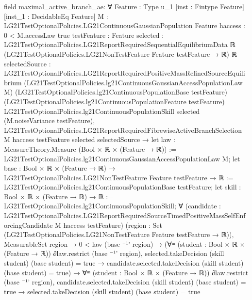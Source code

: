 \documentclass[10pt]{article}
\begin{document}
\begin{ReviewVerbatim}
field maximal_active_branch_ae:
∀ {Feature : Type u_1} [inst : Fintype Feature] [inst_1 : DecidableEq Feature]
  {M : LG21TestOptionalPolicies.LG21ContinuousGaussianPopulation Feature} {haccess : 0 < M.accessLaw {true}}
  {testFeature : Feature}
  {selected :
    LG21TestOptionalPolicies.LG21ReportRequiredSequentialEquilibriumData ℝ
      (LG21TestOptionalPolicies.LG21NonTestFeature Feature testFeature → ℝ) ℝ}
  {selectedSource :
    LG21TestOptionalPolicies.LG21ReportRequiredPositiveMassRefinedSourceEquilibrium
      (LG21TestOptionalPolicies.lg21ContinuousGaussianAccessPopulationLaw M)
      (LG21TestOptionalPolicies.lg21ContinuousPopulationBase testFeature)
      (LG21TestOptionalPolicies.lg21ContinuousPopulationFeature testFeature)
      LG21TestOptionalPolicies.lg21ContinuousPopulationSkill selected (M.noiseVariance testFeature)},
  LG21TestOptionalPolicies.LG21ReportRequiredFibrewiseActiveBranchSelection M haccess testFeature selected
      selectedSource →
    let law : MeasureTheory.Measure (Bool × ℝ × (Feature → ℝ)) :=
      LG21TestOptionalPolicies.lg21ContinuousGaussianAccessPopulationLaw M;
    let base : Bool × ℝ × (Feature → ℝ) → LG21TestOptionalPolicies.LG21NonTestFeature Feature testFeature → ℝ :=
      LG21TestOptionalPolicies.lg21ContinuousPopulationBase testFeature;
    let skill : Bool × ℝ × (Feature → ℝ) → ℝ := LG21TestOptionalPolicies.lg21ContinuousPopulationSkill;
    ∀
      (candidate :
        LG21TestOptionalPolicies.LG21ReportRequiredSourceTimedPositiveMassSelfEnforcingCandidate M haccess testFeature)
      (region : Set (LG21TestOptionalPolicies.LG21NonTestFeature Feature testFeature → ℝ)),
      MeasurableSet region →
        0 < law (base ⁻¹' region) →
          (∀ᵐ (student : Bool × ℝ × (Feature → ℝ)) ∂law.restrict (base ⁻¹' region),
              selected.takeDecision (skill student) (base student) = true →
                candidate.selected.takeDecision (skill student) (base student) = true) →
            ∀ᵐ (student : Bool × ℝ × (Feature → ℝ)) ∂law.restrict (base ⁻¹' region),
              candidate.selected.takeDecision (skill student) (base student) = true →
                selected.takeDecision (skill student) (base student) = true
\end{ReviewVerbatim}
\end{document}
